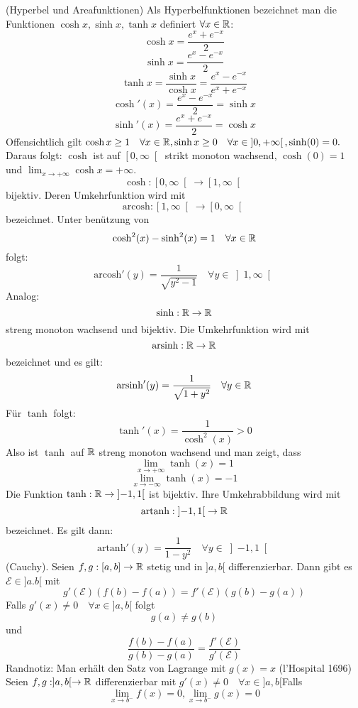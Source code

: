 \Bsp[4.20](Hyperbel und Areafunktionen) \newline
Als Hyperbelfunktionen bezeichnet man die Funktionen \(\cosh x, \sinh x, \tanh x\) definiert \( \forall x \in \mathbb{R} \):
\[ \cosh x = \frac{e^x + e^{-x}}{2}\]
\[ \sinh x = \frac{e^x - e^{-x}}{2}\]
\[ \tanh x = \frac{\sinh x }{\cosh x} = \frac{e^x - e^{-x}}{e^x+e^{-x}}\]
\[ \cosh'(x) = \frac{e^x - e^{-x}}{2} = \sinh x\]
\[ \sinh'(x) = \frac{e^x + e^{-x}}{2} = \cosh x\]
Offensichtlich gilt \(\cosh x \geq 1 \quad \forall x \in \mathbb{R}, \sinh x \geq 0 \quad \forall x \in \left]0,+\infty \right[, \sinh(0) = 0.\) Daraus folgt: \(\cosh \) ist auf \(\left[0,\infty\right[\) strikt monoton wachsend, \(\cosh(0) = 1\) und \( \lim_{x \rightarrow +\infty} \cosh x = +\infty\).
\[ \cosh : \left[0,\infty \right[ \rightarrow \left[1,\infty\right[\]
bijektiv. Deren Umkehrfunktion wird mit
\[ \text{arcosh} : \left[1,\infty\right[ \rightarrow \left[ 0, \infty \right[ \]
bezeichnet. Unter benützung von
\[ \cosh^2(x) - \sinh^2(x) = 1 \quad \forall x \in \mathbb{R} \]
folgt:
\[ \text{arcosh}'(y) = \frac{1}{\sqrt{y^2-1}} \quad \forall y \in \left]1,\infty\right[\]
Analog:
\[ \sinh : \mathbb{R} \rightarrow \mathbb{R}\]
streng monoton wachsend und bijektiv. Die Umkehrfunktion wird mit
\[ \text{arsinh} : \mathbb{R} \rightarrow \mathbb{R}\]
bezeichnet und es gilt:
\[ \text{arsinh}'(y) = \frac{1}{\sqrt{1 + y^2}} \quad \forall y \in \mathbb{R} \]
Für \(\tanh \) folgt:
\[ \tanh'(x) = \frac{1}{\cosh^2(x)} > 0\]
Also ist \( \tanh\) auf \( \mathbb{R}\) streng monoton wachsend und man zeigt, dass
\[ \lim_{x \rightarrow +\infty} \tanh(x) = 1\]
\[ \lim_{x \rightarrow -\infty} \tanh(x) = -1\]
Die Funktion \(\tanh : \mathbb{R} \rightarrow \left] -1,1\right[ \) ist bijektiv. Ihre Umkehrabbildung wird mit
\[\text{artanh} : \left]-1,1\right[ \rightarrow \mathbb{R} \]
bezeichnet. Es gilt dann:
\[ \text{artanh}'(y) = \frac{1}{1-y^2} \quad \forall y \in \left]-1,1\right[\]
\Satz[4.22] (Cauchy). Seien \(f,g : [a,b] \rightarrow \mathbb{R} \) stetig und in \(]a,b[\) differenzierbar. Dann gibt es \( \mathcal{E} \in ]a.b[ \) mit 
\[ g'(\mathcal{E}) (f(b) - f(a)) = f'(\mathcal{E}) (g(b) - g(a))\]
Falls \(g'(x) \neq 0 \quad \forall x \in ]a,b[ \) folgt
\[g(a) \neq g(b)\]
und
\[\frac{f(b) - f(a)}{g(b) - g(a) } = \frac{f'(\mathcal{E})}{g'(\mathcal{E})}\]
Randnotiz: Man erhält den Satz von Lagrange mit \(g(x) = x\) \newline
\Satz[4.23] (l'Hospital 1696) Seien \(f,g : ]a,b[ \rightarrow \mathbb{R} \) differenzierbar mit \(g'(x) \neq 0 \quad \forall x \in ]a,b[\)\newline Falls
\[ \lim\limits_{x \rightarrow b^-}f(x) = 0, \lim\limits_{x \rightarrow b^-} g(x) = 0\]
